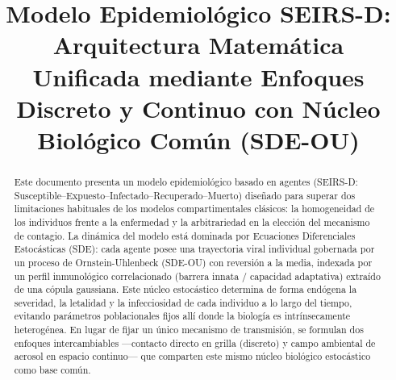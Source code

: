 \documentclass[conference]{IEEEtran}
\begin{document}
\title{Modelo Epidemiológico SEIRS-D: Arquitectura Matemática Unificada mediante Enfoques Discreto y Continuo con Núcleo Biológico Común (SDE-OU)}

\author{
    \and
    \and

}

\maketitle

\begin{abstract}
Este documento presenta un modelo epidemiológico basado en agentes (SEIRS-D: Susceptible–Expuesto–Infectado–Recuperado–Muerto) diseñado para superar dos limitaciones habituales de los modelos compartimentales clásicos: la homogeneidad de los individuos frente a la enfermedad y la arbitrariedad en la elección del mecanismo de contagio. La dinámica del modelo está dominada por Ecuaciones Diferenciales Estocásticas (SDE): cada agente posee una trayectoria viral individual gobernada por un proceso de Ornstein-Uhlenbeck (SDE-OU) con reversión a la media, indexada por un perfil inmunológico correlacionado (barrera innata / capacidad adaptativa) extraído de una cópula gaussiana. Este núcleo estocástico determina de forma endógena la severidad, la letalidad y la infecciosidad de cada individuo a lo largo del tiempo, evitando parámetros poblacionales fijos allí donde la biología es intrínsecamente heterogénea. En lugar de fijar un único mecanismo de transmisión, se formulan dos enfoques intercambiables ---contacto directo en grilla (discreto) y campo ambiental de aerosol en espacio continuo--- que comparten este mismo núcleo biológico estocástico como base común.
\end{abstract}
\end{document}
